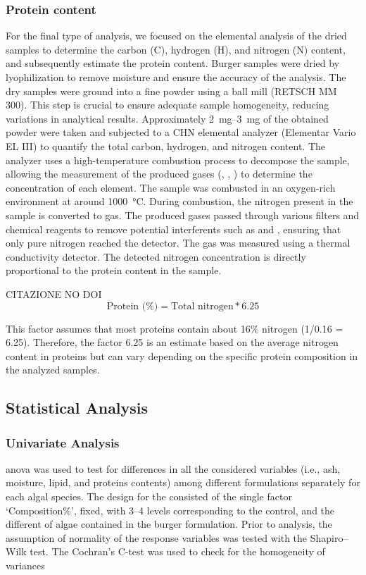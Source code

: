 \subsubsection{Protein content}
For the final type of analysis, we focused on the elemental analysis of the dried samples to determine the carbon (C), hydrogen (H), and nitrogen (N) content, and subsequently estimate the protein content.
Burger samples were dried by lyophilization to remove moisture and ensure the accuracy of the analysis. The dry samples were ground into a fine powder using a ball mill (RETSCH MM 300). This step is crucial to ensure adequate sample homogeneity, reducing variations in analytical results. Approximately \qtyrange{2}{3}{\milli\gram} of the obtained powder were taken and subjected to a CHN elemental analyzer (Elementar Vario EL III) to quantify the total carbon, hydrogen, and nitrogen content. The analyzer uses a high-temperature combustion process to decompose the sample, allowing the measurement of the produced gases (, , ) to determine the concentration of each element.
The sample was combusted in an oxygen-rich environment at around \qty{1000}{\degreeCelsius}. During combustion, the nitrogen present in the sample is converted to  gas. The produced gases passed through various filters and chemical reagents to remove potential interferents such as  and , ensuring that only pure nitrogen reached the detector. The  gas was measured using a thermal conductivity detector. The detected nitrogen concentration is directly proportional to the protein content in the sample.

CITAZIONE NO DOI
\[
    \text{Protein (\%)} = \text{Total nitrogen} * 6.25
\]

This factor assumes that most proteins contain about 16\% nitrogen (1/0.16 = 6.25). Therefore, the factor 6.25 is an estimate based on the average nitrogen content in proteins but can vary depending on the specific protein composition in the analyzed samples.

\subsection{Statistical Analysis}
\subsubsection{Univariate Analysis}
\Gls{anova} was used to test for differences in all the considered variables (i.e., ash, moisture, lipid, and proteins contents) among different formulations separately for each algal species. The design for the consisted of the single factor ‘Composition\%’, fixed, with \numrange[range-phrase={--}]{3}{4} levels corresponding to the control, and the different \zxriv{\%} of algae contained in the burger formulation. Prior to analysis, the assumption of normality of the response variables was tested with the Shapiro–Wilk test. The Cochran’s C-test was used to check for the homogeneity of variances 

